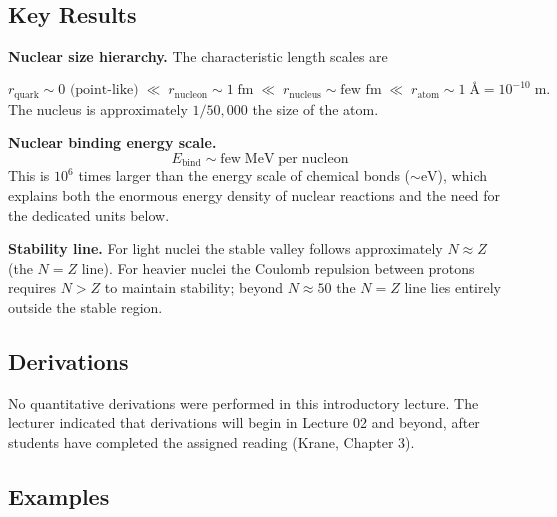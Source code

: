 \subsection*{Key Results}

\textbf{Nuclear size hierarchy.}  The characteristic length scales are

\begin{equation}
  r_{\text{quark}} \sim 0 \text{ (point-like)}
  \;\ll\;
  r_{\text{nucleon}} \sim 1\;\mathrm{fm}
  \;\ll\;
  r_{\text{nucleus}} \sim \text{few fm}
  \;\ll\;
  r_{\text{atom}} \sim 1\;\text{\AA} = 10^{-10}\;\mathrm{m}.
  \label{eq:lec01:scales}
\end{equation}
The nucleus is approximately $1/50{,}000$ the size of the atom.

\textbf{Nuclear binding energy scale.}
\begin{equation}\boxed{
  E_{\text{bind}} \sim \text{few}\;\mathrm{MeV \; per \; nucleon}
  \label{eq:lec01:bind_scale}
}\end{equation}
This is $10^{6}$ times larger than the energy scale of chemical bonds
($\sim\mathrm{eV}$), which explains both the enormous energy density
of nuclear reactions and the need for the dedicated units below.

\textbf{Stability line.}
For light nuclei the stable valley follows approximately
$N \approx Z$ (the $N=Z$ line).
For heavier nuclei the Coulomb repulsion between protons requires
$N > Z$ to maintain stability; beyond $N \approx 50$ the $N=Z$ line
lies entirely outside the stable region.


\subsection*{Derivations}

No quantitative derivations were performed in this introductory
lecture.  The lecturer indicated that derivations will begin in
Lecture 02 and beyond, after students have completed the assigned
reading (Krane, Chapter 3).


\subsection*{Examples}

